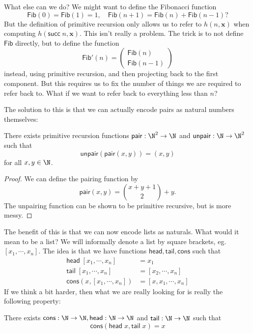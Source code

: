 \documentclass[a4paper]{article}
\newcommand\head{\mathsf{head}}
\newcommand\tail{\mathsf{tail}}
\newcommand\pair{\mathsf{pair}}
\newcommand\unpair{\mathsf{unpair}}
\renewcommand\succ{\mathsf{succ}}
\newcommand\cons{\mathsf{cons}}
\begin{document}
What else can we do? We might want to define the Fibonacci function
\[
  \mathsf{Fib}(0) = \mathsf{Fib}(1) = 1, \quad \mathsf{Fib}(n + 1) = \mathsf{Fib}(n) + \mathsf{Fib}(n - 1)?
\]
But the definition of primitive recursion only allows us to refer to $h(n, \mathbf{x})$ when computing $h(\succ \; n, \mathbf{x})$. This isn't really a problem. The trick is to not define $\mathsf{Fib}$ directly, but to define the function
\[
  \mathsf{Fib}' (n) =
  \begin{pmatrix}
  \mathsf{Fib} (n)\\
  \mathsf{Fib} (n - 1)
  \end{pmatrix}
\]
instead, using primitive recursion, and then projecting back to the first component. But this requires us to fix the number of things we are required to refer back to. What if we want to refer back to everything less than $n$?

The solution to this is that we can actually encode pairs as natural numbers themselves:
\begin{prop}
  There exists primitive recursion functions $\pair: \N^2 \to \N$ and $\unpair: \N \to \N^2$ such that
  \[
    \unpair (\pair(x, y)) = (x, y)
  \]
  for all $x, y \in \N$.
\end{prop}

\begin{proof}
  We can define the pairing function by
  \[
    \pair(x, y) = \binom{x + y + 1}{2} + y.
  \]
  The unpairing function can be shown to be primitive recursive, but is more messy.
\end{proof}

The benefit of this is that we can now encode lists as naturals. What would it mean to be a list? We will informally denote a list by square brackets, eg. $[x_1, \cdots, x_n]$. The idea is that we have functions $\head, \tail, \cons$ such that
\begin{align*}
  \head\; [x_1, \cdots, x_n] &= x_1\\
  \tail\; [x_1, \cdots, x_n] &= [x_2, \cdots, x_n]\\
  \cons (x, [x_1, \cdots, x_n]) &= [x, x_1, \cdots, x_n]
\end{align*}
If we think a bit harder, then what we are really looking for is really the following property:
\begin{cor}
  There exists $\cons : \N \to \N, \head: \N \to \N$ and $\tail: \N \to \N$ such that
  \[
    \cons (\head \;x, \tail \;x) = x
  \]
\end{cor}
\end{document}
